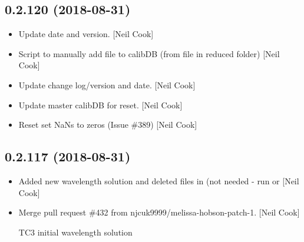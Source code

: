 \documentclass[a4paper,10pt,english]{report}
\begin{document}
\subsection{0.2.120 (2018-08-31)}
\label{\detokenize{misc/changelog:id343}}\begin{itemize}
\item {} 
Update date and version. {[}Neil Cook{]}

\item {} 
Script to manually add file to calibDB (from file in reduced folder)
{[}Neil Cook{]}

\item {} 
Update change log/version and date. {[}Neil Cook{]}

\item {} 
Update master calibDB for reset. {[}Neil Cook{]}

\item {} 
Reset  set NaNs to zeros (Issue \#389) {[}Neil Cook{]}

\end{itemize}


\subsection{0.2.117 (2018-08-31)}
\label{\detokenize{misc/changelog:id344}}\begin{itemize}
\item {} 
Added new wavelength solution and deleted files in  (not
needed - run  or  {[}Neil Cook{]}

\item {} 
Merge pull request \#432 from njcuk9999/melissa-hobson-patch-1. {[}Neil
Cook{]}

TC3 initial wavelength solution

\end{itemize}
\end{document}
